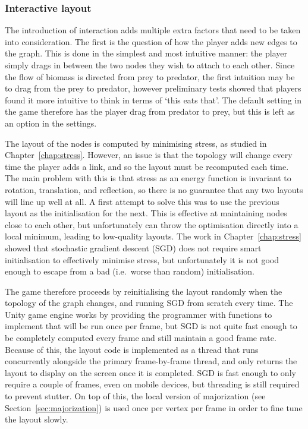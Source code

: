 \subsubsection{Interactive layout}
The introduction of interaction adds multiple extra factors that need to be taken into consideration.
The first is the question of how the player adds new edges to the graph. This is done in the simplest and most intuitive manner: the player simply drags in between the two nodes they wish to attach to each other. Since the flow of biomass is directed from prey to predator, the first intuition may be to drag from the prey to predator, however preliminary tests showed that players found it more intuitive to think in terms of `this eats that'. The default setting in the game therefore has the player drag from predator to prey, but this is left as an option in the settings.

The layout of the nodes is computed by minimising stress, as studied in Chapter~\ref{chap:stress}.
However, an issue is that the topology will change every time the player adds a link, and so the layout must be recomputed each time.
The main problem with this is that stress as an energy function is invariant to rotation, translation, and reflection, so there is no guarantee that any two layouts will line up well at all.
A first attempt to solve this was to use the previous layout as the initialisation for the next. This is effective at maintaining nodes close to each other, but unfortunately can throw the optimisation directly into a local minimum, leading to low-quality layouts. The work in Chapter~\ref{chap:stress} showed that stochastic gradient descent (SGD) does not require smart initialisation to effectively minimise stress, but unfortunately it is not good enough to escape from a bad (i.e.\ worse than random) initialisation.

The game therefore proceeds by reinitialising the layout randomly when the topology of the graph changes, and running SGD from scratch every time. The Unity game engine works by providing the programmer with functions to implement that will be run once per frame, but SGD is not quite fast enough to be completely computed every frame and still maintain a good frame rate.
Because of this, the layout code is implemented as a thread that runs concurrently alongside the primary frame-by-frame thread, and only returns the layout to display on the screen once it is completed. SGD is fast enough to only require a couple of frames, even on mobile devices, but threading is still required to prevent stutter.
On top of this, the local version of majorization (see Section~\ref{sec:majorization}) is used once per vertex per frame in order to fine tune the layout slowly.

